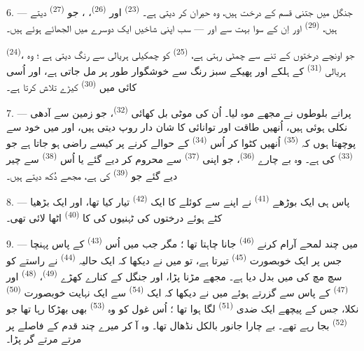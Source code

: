 6. --- جنگل میں جتنی قسم کے درخت ہیں، وہ حیران کر دیتی ہے۔
 \textsuperscript{(23)} اور 
\textsuperscript{(26)}، ، جو 
\textsuperscript{(27)} دیتے ہیں،  \textsuperscript{(29)}
اور اِن کے سوا بہت سے اور — سب اپنی شاخیں ایک دوسرے میں الجھائے ہوئے
ہیں۔

 \textsuperscript{(24)}، جو اونچے درختوں کے تنے سے چمٹی
رہتی ہے،  \textsuperscript{(25)} کو چمکیلی ہریالی سے رنگ
دیتی ہے ؛ وہ ہریالی  \textsuperscript{(31)} کے ہلکے اور
پھیکے سبز رنگ سے خوشگوار طور پر مل جاتی ہے، اور اُسی کائی میں
 \textsuperscript{(30)} کیڑے تلاش کرتا ہے۔

\VUsaut{3.0mm}
\VUsaut{3.0mm}

7. --- پرانے بلوطوں نے مجھے موہ لیا۔ اُن کی موٹی بل کھائی
 \textsuperscript{(32)}، جو زمین سے آدھی نکلی ہوئی ہیں،
اُنھیں طاقت اور توانائی کا شان دار روپ دیتی ہیں، اور میں خود سے
پوچھتا ہوں کہ  \textsuperscript{(35)} اُنھیں کٹوا کر اُس
 \textsuperscript{(34)} کے حوالے کرنے پر کیسے راضی ہو
جاتا ہے جو  \textsuperscript{(33)} کی ہے۔ وہ بے
چارے  \textsuperscript{(36)}، جو اپنی 
\textsuperscript{(37)} سے محروم کر دیے گئے یا اُس
 \textsuperscript{(38)} سے چیر دیے گئے جو
 \textsuperscript{(39)} کی ہے، مجھے دُکھ
دیتے ہیں۔

8. --- پاس ہی ایک بوڑھے 
\textsuperscript{(41)} نے اپنے  سے کوئلے کا ایک
 \textsuperscript{(42)} تیار کیا تھا، اور ایک بڑھیا کٹے
ہوئے درختوں کی ٹہنیوں کی  کا 
\textsuperscript{(40)} اٹھا لائی تھی۔

\VUsaut{3.0mm}
\VUsaut{3.0mm}

9. --- میں چند لمحے آرام کرنے 
\textsuperscript{(46)} جانا چاہتا تھا ؛ مگر جب میں اُس  \textsuperscript{(43)} کے پاس پہنچا جس پر ایک خوبصورت
 \textsuperscript{(45)} تیرتا ہے، تو میں نے دیکھا کہ ایک
حالیہ  \textsuperscript{(44)} نے راستے کو سچ مچ کی
 میں بدل دیا ہے۔ مجھے مڑنا پڑا، اور جنگل کے کنارے کھڑے
 \textsuperscript{(49)}، 
\textsuperscript{(48)} اور  \textsuperscript{(47)} کے
پاس سے گزرتے ہوئے میں نے دیکھا کہ ایک 
\textsuperscript{(54)} سے ایک نہایت خوبصورت 
\textsuperscript{(50)} نکلا، جس کے پیچھے ایک ضدی  \textsuperscript{(51)} لگا ہوا تھا ؛ اُس غول کو وہ
 \textsuperscript{(53)} بھی بھڑکا رہا تھا جو
 \textsuperscript{(52)} بجا رہے تھے۔ بے چارا جانور بالکل نڈھال
تھا۔ وہ آ کر میرے چند قدم کے فاصلے پر مرتے مرتے گر پڑا۔

